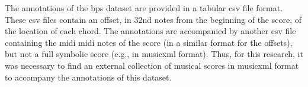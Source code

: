 

The annotations of the \gls{bps} dataset are provided in a
tabular \gls{csv} file format. These \gls{csv} files contain
an offset, in 32nd notes from the beginning of the score, of
the location of each chord. The annotations are accompanied
by another \gls{csv} file containing the midi
\gls{midi} notes of the score (in a similar format for the
offsets), but not a full symbolic score (e.g., in
\gls{musicxml} format). Thus, for this research, it was
necessary to find an external collection of musical scores
in \gls{musicxml} format to accompany the annotations of
this dataset.